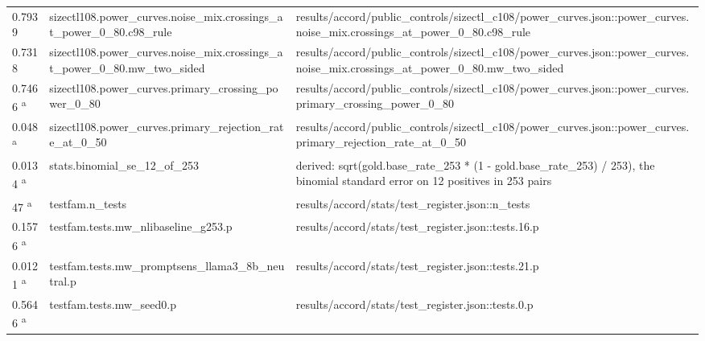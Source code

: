 \begin{longtable}{@{}p{0.7in}p{1.9in}p{2.6in}@{}}
0.7939 & sizectl108.\allowbreak{}power\_curves.\allowbreak{}noise\_mix.\allowbreak{}crossings\_at\_power\_0\_80.\allowbreak{}c98\_rule & results/\allowbreak{}accord/\allowbreak{}public\_controls/\allowbreak{}sizectl\_c108/\allowbreak{}power\_curves.\allowbreak{}json::power\_curves.\allowbreak{}noise\_mix.\allowbreak{}crossings\_at\_power\_0\_80.\allowbreak{}c98\_rule\\
0.7318 & sizectl108.\allowbreak{}power\_curves.\allowbreak{}noise\_mix.\allowbreak{}crossings\_at\_power\_0\_80.\allowbreak{}mw\_two\_sided & results/\allowbreak{}accord/\allowbreak{}public\_controls/\allowbreak{}sizectl\_c108/\allowbreak{}power\_curves.\allowbreak{}json::power\_curves.\allowbreak{}noise\_mix.\allowbreak{}crossings\_at\_power\_0\_80.\allowbreak{}mw\_two\_sided\\
0.7466 \textsuperscript{a} & sizectl108.\allowbreak{}power\_curves.\allowbreak{}primary\_crossing\_power\_0\_80 & results/\allowbreak{}accord/\allowbreak{}public\_controls/\allowbreak{}sizectl\_c108/\allowbreak{}power\_curves.\allowbreak{}json::power\_curves.\allowbreak{}primary\_crossing\_power\_0\_80\\
0.048 \textsuperscript{a} & sizectl108.\allowbreak{}power\_curves.\allowbreak{}primary\_rejection\_rate\_at\_0\_50 & results/\allowbreak{}accord/\allowbreak{}public\_controls/\allowbreak{}sizectl\_c108/\allowbreak{}power\_curves.\allowbreak{}json::power\_curves.\allowbreak{}primary\_rejection\_rate\_at\_0\_50\\
0.0134 \textsuperscript{a} & stats.\allowbreak{}binomial\_se\_12\_of\_253 & derived: sqrt(gold.\allowbreak{}base\_rate\_253 * (1 - gold.\allowbreak{}base\_rate\_253) /\allowbreak{} 253), the binomial standard error on 12 positives in 253 pairs\\
47 \textsuperscript{a} & testfam.\allowbreak{}n\_tests & results/\allowbreak{}accord/\allowbreak{}stats/\allowbreak{}test\_register.\allowbreak{}json::n\_tests\\
0.1576 \textsuperscript{a} & testfam.\allowbreak{}tests.\allowbreak{}mw\_nlibaseline\_g253.\allowbreak{}p & results/\allowbreak{}accord/\allowbreak{}stats/\allowbreak{}test\_register.\allowbreak{}json::tests.\allowbreak{}16.\allowbreak{}p\\
0.0121 \textsuperscript{a} & testfam.\allowbreak{}tests.\allowbreak{}mw\_promptsens\_llama3\_8b\_neutral.\allowbreak{}p & results/\allowbreak{}accord/\allowbreak{}stats/\allowbreak{}test\_register.\allowbreak{}json::tests.\allowbreak{}21.\allowbreak{}p\\
0.5646 \textsuperscript{a} & testfam.\allowbreak{}tests.\allowbreak{}mw\_seed0.\allowbreak{}p & results/\allowbreak{}accord/\allowbreak{}stats/\allowbreak{}test\_register.\allowbreak{}json::tests.\allowbreak{}0.\allowbreak{}p\\

\end{longtable}
